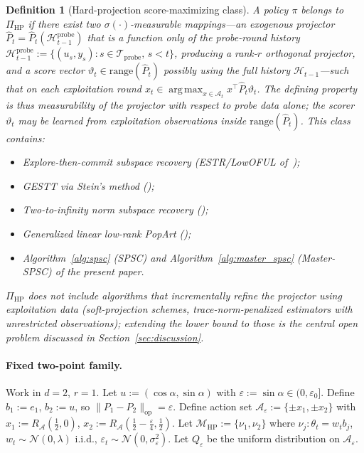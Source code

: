 \documentclass[11pt]{article}
\newcommand{\op}{\mathrm{op}}
\newcommand{\cA}{\mathcal{A}}
\newcommand{\cH}{\mathcal{H}}
\newcommand{\cTprobe}{\mathcal{T}_{\mathrm{probe}}}
\newcommand{\range}{\mathrm{range}}
\DeclareMathOperator*{\argmax}{arg\,max}
\newtheorem{definition}{Definition}
\begin{document}
\begin{definition}[Hard-projection score-maximizing class]
\label{def:hard_projection}
A policy $\pi$ belongs to $\Pi_{\mathrm{HP}}$ if there exist two
$\sigma(\cdot)$-measurable mappings---an \emph{exogenous projector}
$\widehat P_t=\widehat P_t(\cH_{t-1}^{\mathrm{probe}})$ that is a function
\emph{only of the probe-round history}
$\cH_{t-1}^{\mathrm{probe}}:=\{(u_s,y_s):s\in\cTprobe,\,s<t\}$, producing a
rank-$r$ orthogonal projector, and a score vector
$\vartheta_t\in\range(\widehat P_t)$ possibly using the full history
$\cH_{t-1}$---such that on each exploitation round
$x_t\in\argmax_{x\in\cA_t}x^\top\widehat P_t\vartheta_t$.  The defining
property is thus \emph{measurability of the projector with respect to probe data
alone}; the scorer $\vartheta_t$ may be learned from exploitation observations
inside $\range(\widehat P_t)$.  This class contains:
\begin{itemize}[leftmargin=1.4em,nosep]
\item Explore-then-commit subspace recovery (ESTR/LowOFUL
of~\citet{jun2019bilinear});
\item GESTT via Stein's method (\citet{kang2022gestt});
\item Two-to-infinity norm subspace recovery (\citet{pmlr-v235-jedra24a});
\item Generalized linear low-rank PopArt (\citet{lee2026gllowpopart});
\item Algorithm~\ref{alg:spsc} (SPSC) and
Algorithm~\ref{alg:master_spsc} (Master-SPSC) of the present paper.
\end{itemize}
$\Pi_{\mathrm{HP}}$ does \emph{not} include algorithms that incrementally
refine the projector using exploitation data (soft-projection schemes,
trace-norm-penalized estimators with unrestricted observations); extending the
lower bound to those is the central open problem discussed in
Section~\ref{sec:discussion}.
\end{definition}

\paragraph{Fixed two-point family.}
Work in $d=2$, $r=1$.
Let $u:=(\cos\alpha,\sin\alpha)$ with $\varepsilon:=\sin\alpha\in(0,\varepsilon_0]$.
Define $b_1:=e_1$, $b_2:=u$, so
$\|P_1-P_2\|_{\op}=\varepsilon$.
Define action set
$\cA_\varepsilon:=\{\pm x_1,\pm x_2\}$ with
$x_1:=R_{\cA}(\tfrac{1}{2},0)$,
$x_2:=R_{\cA}(\tfrac{1}{2}{-}\tfrac{\varepsilon}{4},\tfrac{1}{2})$.
Let $\mathcal{M}_{\mathrm{HP}}:=\{\nu_1,\nu_2\}$ where
$\nu_j:\theta_t=w_tb_j$, $w_t\sim\mathcal{N}(0,\lambda)$ i.i.d.,
$\varepsilon_t\sim\mathcal{N}(0,\sigma_\varepsilon^2)$.
Let $Q_\varepsilon$ be the uniform distribution on $\cA_\varepsilon$.
\end{document}
